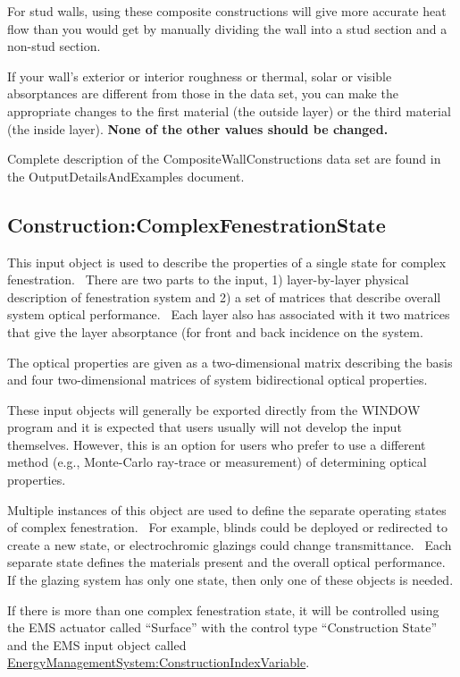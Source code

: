 For stud walls, using these composite constructions will give more accurate heat flow than you would get by manually dividing the wall into a stud section and a non-stud section.

If your wall's exterior or interior roughness or thermal, solar or visible absorptances are different from those in the data set, you can make the appropriate changes to the first material (the outside layer) or the third material (the inside layer). \textbf{None of the other values should be changed.}

\begin{callout}
Complete description of the CompositeWallConstructions data set are found in the OutputDetailsAndExamples document.
\end{callout}

\subsection{Construction:ComplexFenestrationState}\label{constructioncomplexfenestrationstate}

This input object is used to describe the properties of a single state for complex fenestration.~ There are two parts to the input, 1) layer-by-layer physical description of fenestration system and 2) a set of matrices that describe overall system optical performance.~ Each layer also has associated with it two matrices that give the layer absorptance (for front and back incidence on the system.

The optical properties are given as a two-dimensional matrix describing the basis and four two-dimensional matrices of system bidirectional optical properties.

These input objects will generally be exported directly from the WINDOW program and it is expected that users usually will not develop the input themselves. However, this is an option for users who prefer to use a different method (e.g., Monte-Carlo ray-trace or measurement) of determining optical properties.

Multiple instances of this object are used to define the separate operating states of complex fenestration.~ For example, blinds could be deployed or redirected to create a new state, or electrochromic glazings could change transmittance.~ Each separate state defines the materials present and the overall optical performance.~ If the glazing system has only one state, then only one of these objects is needed.

If there is more than one complex fenestration state, it will be controlled using the EMS actuator called ``Surface'' with the control type ``Construction State'' and the EMS input object called \hyperref[energymanagementsystemconstructionindexvariable]{EnergyManagementSystem:ConstructionIndexVariable}.

